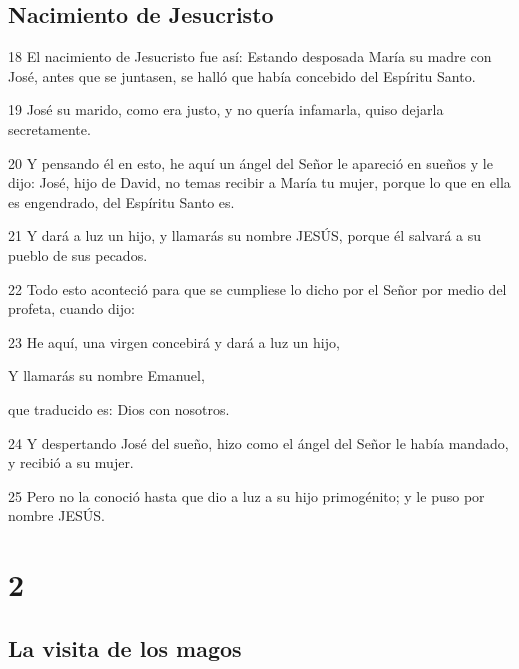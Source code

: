 \section*{Nacimiento de Jesucristo}

\par 18 El nacimiento de Jesucristo fue así: Estando desposada María su madre con José, antes que se juntasen, se halló que había concebido del Espíritu Santo.
\par 19 José su marido, como era justo, y no quería infamarla, quiso dejarla secretamente.
\par 20 Y pensando él en esto, he aquí un ángel del Señor le apareció en sueños y le dijo: José, hijo de David, no temas recibir a María tu mujer, porque lo que en ella es engendrado, del Espíritu Santo es.
\par 21 Y dará a luz un hijo, y llamarás su nombre JESÚS, porque él salvará a su pueblo de sus pecados.
\par 22 Todo esto aconteció para que se cumpliese lo dicho por el Señor por medio del profeta, cuando dijo:
\par 23 He aquí, una virgen concebirá y dará a luz un hijo,
\par Y llamarás su nombre Emanuel,
\par que traducido es: Dios con nosotros.
\par 24 Y despertando José del sueño, hizo como el ángel del Señor le había mandado, y recibió a su mujer.
\par 25 Pero no la conoció hasta que dio a luz a su hijo primogénito; y le puso por nombre JESÚS.

\chapter{2}

\section*{La visita de los magos}

